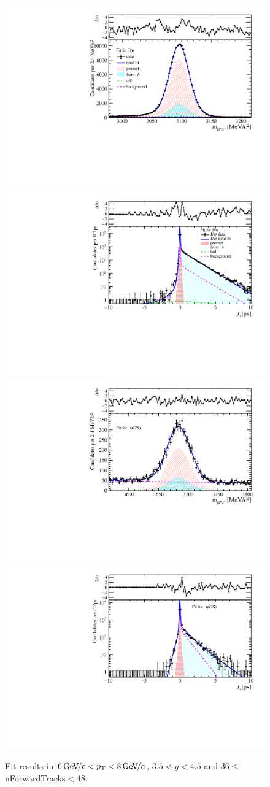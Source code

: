 \begin{figure}[H]
\begin{center}
\includegraphics[width=0.47\linewidth]{pdf/Jpsi/drawmassF/n4y3pt4.pdf}
\includegraphics[width=0.47\linewidth]{pdf/Jpsi/2DFitF/n4y3pt4.pdf}
\vspace*{-0.5cm}
\includegraphics[width=0.47\linewidth]{pdf/Psi2S/drawmassF/n4y3pt4.pdf}
\includegraphics[width=0.47\linewidth]{pdf/Psi2S/2DFitF/n4y3pt4.pdf}
\vspace*{-0.5cm}
\end{center}
\caption{Fit results in $6\text{\,Ge\kern -0.1em V\!/}c<p_{\mathrm{T}}<8\text{\,Ge\kern -0.1em V\!/}c$, $3.5<y<4.5$ and 36$\leq$nForwardTracks$<$48.}
\label{Fitn4y3pt4}
\end{figure}
